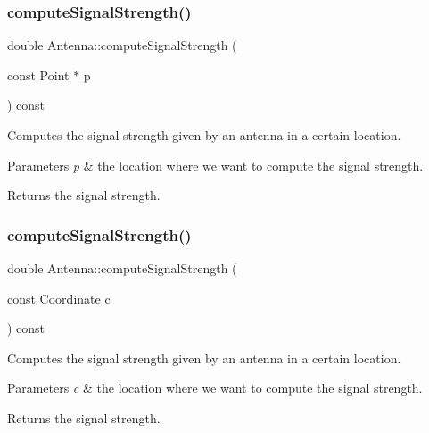 \mbox{\label{class_antenna_a228297a3cb00c11fab97d615b4817656}} 
\subsubsection{\texorpdfstring{compute\+Signal\+Strength()}{computeSignalStrength()}\hspace{0.1cm}{\footnotesize\ttfamily [1/2]}}
{\footnotesize\ttfamily double Antenna\+::compute\+Signal\+Strength (\begin{DoxyParamCaption}\item[{const Point $\ast$}]{p }\end{DoxyParamCaption}) const}

Computes the signal strength given by an antenna in a certain location. 
\begin{DoxyParams}{Parameters}
{\em p} & the location where we want to compute the signal strength. \\
\hline
\end{DoxyParams}
\begin{DoxyReturn}{Returns}
the signal strength. 
\end{DoxyReturn}
\mbox{\label{class_antenna_ac33fe5654d4e3307a4c1c155b0f89128}} 
\subsubsection{\texorpdfstring{compute\+Signal\+Strength()}{computeSignalStrength()}\hspace{0.1cm}{\footnotesize\ttfamily [2/2]}}
{\footnotesize\ttfamily double Antenna\+::compute\+Signal\+Strength (\begin{DoxyParamCaption}\item[{const Coordinate}]{c }\end{DoxyParamCaption}) const\hspace{0.3cm}{\ttfamily [private]}}

Computes the signal strength given by an antenna in a certain location. 
\begin{DoxyParams}{Parameters}
{\em c} & the location where we want to compute the signal strength. \\
\hline
\end{DoxyParams}
\begin{DoxyReturn}{Returns}
the signal strength. 
\end{DoxyReturn}
\mbox{\label{class_antenna_a38bb70c5ca249773512186c34792b43a}} 
